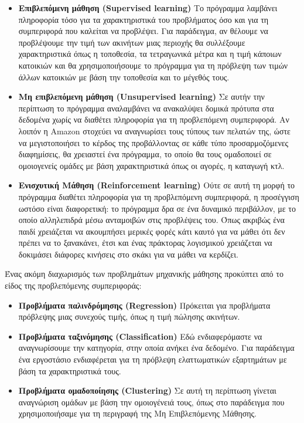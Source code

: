 \begin{itemize}
	\item \textbf{Επιβλεπόμενη μάθηση (Supervised learning)} Το πρόγραμμα λαμβάνει πληροφορία τόσο για τα χαρακτηριστικά του προβλήματος όσο και για τη συμπεριφορά που καλείται να προβλέψει. Για παράδειγμα, αν θέλουμε να προβλέψουμε την τιμή των ακινήτων μιας περιοχής θα συλλέξουμε χαρακτηριστικά όπως η τοποθεσία, τα τετραγωνικά μέτρα και η τιμή κάποιων κατοικιών και θα χρησιμοποιήσουμε το πρόγραμμα για τη πρόβλεψη των τιμών άλλων κατοικιών με βάση την τοποθεσία και το μέγεθός τους.
	\item \textbf{Μη επιβλεπόμενη μάθηση (Unsupervised learning)} Σε αυτήν την περίπτωση το πρόγραμμα αναλαμβάνει να ανακαλύψει δομικά πρότυπα στα δεδομένα χωρίς να διαθέτει πληροφορία για τη προβλεπόμενη συμπεριφορά. Αν λοιπόν η Amazon στοχεύει να αναγνωρίσει τους τύπους των πελατών της, ώστε να μεγιστοποιήσει το κέρδος της προβάλλοντας σε κάθε τύπο προσαρμοζόμενες διαφημίσεις, θα χρειαστεί ένα πρόγραμμα, το οποίο θα τους ομαδοποιεί σε ομοιογενείς ομάδες με βάση χαρακτηριστικά όπως οι αγορές, η καταγωγή κτλ.
	\item \textbf{Ενισχυτική Μάθηση (Reinforcement learning)} Ούτε σε αυτή τη μορφή το πρόγραμμα διαθέτει πληροφορία για τη προβλεπόμενη συμπεριφορά, η προσέγγιση ωστόσο είναι διαφορετική: το πρόγραμμα δρα σε ένα δυναμικό περιβάλλον, με το οποίο αλληλεπιδρά μέσω ανταμοιβών στις προβλέψεις του. Όπως ακριβώς ένα παιδί χρειάζεται να ακουμπήσει μερικές φορές κάτι καυτό για να μάθει ότι δεν πρέπει να το ξανακάνει, έτσι και ένας πράκτορας λογισμικού χρειάζεται να δοκιμάσει διάφορες κινήσεις στο σκάκι για να μάθει να κερδίζει.
\end{itemize}

Ένας ακόμη διαχωρισμός των προβλημάτων μηχανικής μάθησης προκύπτει από το είδος της προβλεπόμενης συμπεριφοράς:

\begin{itemize}
	\item \textbf{Προβλήματα παλινδρόμησης (Regression)} Πρόκειται για προβλήματα πρόβλεψης μιας συνεχούς τιμής, όπως η τιμή πώλησης ακινήτων.
	\item \textbf{Προβλήματα ταξινόμησης (Classification)} Εδώ ενδιαφερόμαστε να αναγνωρίσουμε την κατηγορία, στην οποία ανήκει ένα δεδομένο. Για παράδειγμα ένα εργοστάσιο ενδιαφέρεται για τη πρόβλεψη ελαττωματικών εξαρτημάτων με βάση τα χαρακτηριστικά τους.
	\item \textbf{Προβλήματα ομαδοποίησης (Clustering)} Σε αυτή τη περίπτωση γίνεται αναγνώριση ομάδων με βάση την ομοιογένειά τους, όπως στο παράδειγμα που χρησιμοποιήσαμε για τη περιγραφή της Μη Επιβλεπόμενης Μάθησης.
\end{itemize}

